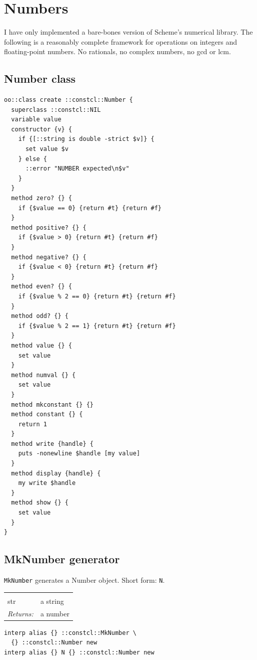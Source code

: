 \documentclass[twoside,9pt]{report}
\begin{document}
\section{Numbers}
\label{numbers}


I have only implemented a bare-bones version of Scheme's numerical library. The following is a reasonably complete framework for operations on integers and floating-point numbers. No rationals, no complex numbers, no gcd or lcm.

\subsection{Number class}
\label{number-class}
\begin{lstlisting}
oo::class create ::constcl::Number {
  superclass ::constcl::NIL
  variable value
  constructor {v} {
    if {[::string is double -strict $v]} {
      set value $v
    } else {
      ::error "NUMBER expected\n$v"
    }
  }
  method zero? {} {
    if {$value == 0} {return #t} {return #f}
  }
  method positive? {} {
    if {$value > 0} {return #t} {return #f}
  }
  method negative? {} {
    if {$value < 0} {return #t} {return #f}
  }
  method even? {} {
    if {$value % 2 == 0} {return #t} {return #f}
  }
  method odd? {} {
    if {$value % 2 == 1} {return #t} {return #f}
  }
  method value {} {
    set value
  }
  method numval {} {
    set value
  }
  method mkconstant {} {}
  method constant {} {
    return 1
  }
  method write {handle} {
    puts -nonewline $handle [my value]
  }
  method display {handle} {
    my write $handle
  }
  method show {} {
    set value
  }
}
\end{lstlisting}
\subsection{MkNumber generator}
\label{mknumber-generator}


\texttt{MkNumber} generates a Number object. Short form: \texttt{N}.

\noindent\begin{tabular}{ |p{1.5cm} p{8cm}| }
\hline
\rowcolor[HTML]{CCCCCC} \multicolumn{2}{|l|}{\bf MkNumber (internal)} \\
str & a string \\
\textit{Returns:} & a number \\
\hline
\end{tabular}
\begin{lstlisting}
interp alias {} ::constcl::MkNumber \
  {} ::constcl::Number new
interp alias {} N {} ::constcl::Number new
\end{lstlisting}
\end{document}
